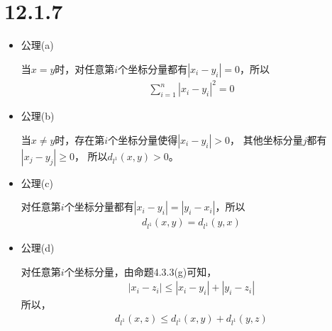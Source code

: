 \documentclass{article}
\begin{document}
\section*{12.1.7}

\begin{itemize}
      \item 公理(a)

            当$x = y$时，对任意第$i$个坐标分量都有$|x_i - y_i| = 0$，所以
            \begin{align*}
                  \sum \limits_{i = 1}^n |x_i - y_i|^2 = 0
            \end{align*}

      \item 公理(b)

            当$x \neq y$时，存在第$i$个坐标分量使得$|x_i - y_i| > 0$，
            其他坐标分量$j$都有$|x_j - y_j| \geq 0$，
            所以$d_{l^1}(x, y) > 0$。

      \item 公理(c)

            对任意第$i$个坐标分量都有$|x_i - y_i| = |y_i - x_i|$，所以
            \begin{align*}
                  d_{l^1}(x, y) = d_{l^1}(y, x)
            \end{align*}

      \item 公理(d)

            对任意第$i$个坐标分量，由命题4.3.3(g)可知，
            \begin{align*}
                  |x_i - z_i| \leq |x_i - y_i| + |y_i - z_i|
            \end{align*}
            所以，
            \begin{align*}
                  d_{l^1}(x, z) \leq d_{l^1}(x, y) + d_{l^1}(y, z)
            \end{align*}

\end{itemize}
\end{document}
